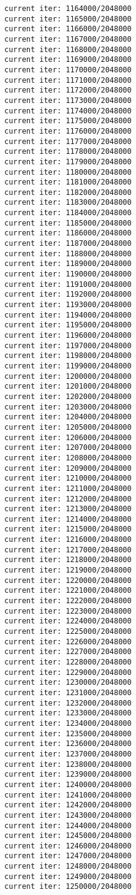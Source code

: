 \documentclass[11pt]{article}
\begin{document}
\begin{Verbatim}[commandchars=\\\{\}]
current iter: 1164000/2048000
current iter: 1165000/2048000
current iter: 1166000/2048000
current iter: 1167000/2048000
current iter: 1168000/2048000
current iter: 1169000/2048000
current iter: 1170000/2048000
current iter: 1171000/2048000
current iter: 1172000/2048000
current iter: 1173000/2048000
current iter: 1174000/2048000
current iter: 1175000/2048000
current iter: 1176000/2048000
current iter: 1177000/2048000
current iter: 1178000/2048000
current iter: 1179000/2048000
current iter: 1180000/2048000
current iter: 1181000/2048000
current iter: 1182000/2048000
current iter: 1183000/2048000
current iter: 1184000/2048000
current iter: 1185000/2048000
current iter: 1186000/2048000
current iter: 1187000/2048000
current iter: 1188000/2048000
current iter: 1189000/2048000
current iter: 1190000/2048000
current iter: 1191000/2048000
current iter: 1192000/2048000
current iter: 1193000/2048000
current iter: 1194000/2048000
current iter: 1195000/2048000
current iter: 1196000/2048000
current iter: 1197000/2048000
current iter: 1198000/2048000
current iter: 1199000/2048000
current iter: 1200000/2048000
current iter: 1201000/2048000
current iter: 1202000/2048000
current iter: 1203000/2048000
current iter: 1204000/2048000
current iter: 1205000/2048000
current iter: 1206000/2048000
current iter: 1207000/2048000
current iter: 1208000/2048000
current iter: 1209000/2048000
current iter: 1210000/2048000
current iter: 1211000/2048000
current iter: 1212000/2048000
current iter: 1213000/2048000
current iter: 1214000/2048000
current iter: 1215000/2048000
current iter: 1216000/2048000
current iter: 1217000/2048000
current iter: 1218000/2048000
current iter: 1219000/2048000
current iter: 1220000/2048000
current iter: 1221000/2048000
current iter: 1222000/2048000
current iter: 1223000/2048000
current iter: 1224000/2048000
current iter: 1225000/2048000
current iter: 1226000/2048000
current iter: 1227000/2048000
current iter: 1228000/2048000
current iter: 1229000/2048000
current iter: 1230000/2048000
current iter: 1231000/2048000
current iter: 1232000/2048000
current iter: 1233000/2048000
current iter: 1234000/2048000
current iter: 1235000/2048000
current iter: 1236000/2048000
current iter: 1237000/2048000
current iter: 1238000/2048000
current iter: 1239000/2048000
current iter: 1240000/2048000
current iter: 1241000/2048000
current iter: 1242000/2048000
current iter: 1243000/2048000
current iter: 1244000/2048000
current iter: 1245000/2048000
current iter: 1246000/2048000
current iter: 1247000/2048000
current iter: 1248000/2048000
current iter: 1249000/2048000
current iter: 1250000/2048000

\end{Verbatim}
\end{document}

